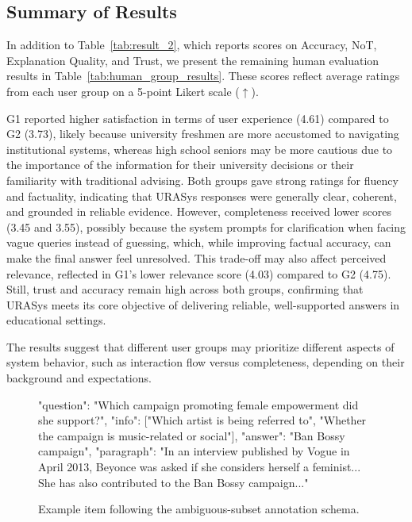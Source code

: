 \documentclass[11pt]{article}
\begin{document}
\subsection{Summary of Results} 

In addition to Table~\ref{tab:result_2}, which reports scores on Accuracy, NoT, Explanation Quality, and Trust, we present the remaining human evaluation results in Table~\ref{tab:human_group_results}. These scores reflect average ratings from each user group on a 5-point Likert scale ($\uparrow$). 

G1 reported higher satisfaction in terms of user experience (4.61) compared to G2 (3.73), likely because university freshmen are more accustomed to navigating institutional systems, whereas high school seniors may be more cautious due to the importance of the information for their university decisions or their familiarity with traditional advising. Both groups gave strong ratings for fluency and factuality, indicating that URASys responses were generally clear, coherent, and grounded in reliable evidence. However, completeness received lower scores (3.45 and 3.55), possibly because the system prompts for clarification when facing vague queries instead of guessing, which, while improving factual accuracy, can make the final answer feel unresolved. This trade-off may also affect perceived relevance, reflected in G1’s lower relevance score (4.03) compared to G2 (4.75). Still, trust and accuracy remain high across both groups, confirming that URASys meets its core objective of delivering reliable, well-supported answers in educational settings. 

The results suggest that different user groups may prioritize different aspects of system behavior, such as interaction flow versus completeness, depending on their background and expectations.

\begin{figure}[!ht]
\centering
\begin{promptblock}
{
  "question": "Which campaign promoting female empowerment did she support?",
  "info": ["Which artist is being referred to", "Whether the campaign is music-related or social"],
  "answer": "Ban Bossy campaign",
  "paragraph": "In an interview published by Vogue in April 2013, Beyonce was asked if she considers herself a feminist... She has also contributed to the Ban Bossy campaign..."
}
\end{promptblock}
\vspace*{-0.2cm}

\caption{Example item following the ambiguous-subset annotation schema.}
\label{fig:ambiguous-json-schema}
\end{figure}
\end{document}
